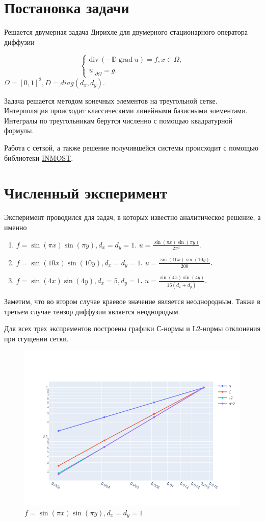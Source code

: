 \documentclass{article}
\DeclareMathOperator{\grad}{grad}
\newcommand{\divg}{\mathrm{div}\,}
\begin{document}
	
\section{Постановка задачи}
Решается двумерная задача Дирихле для двумерного стационарного оператора диффузии

$$
\begin{cases}
    \divg(-\mathbb{D} \grad u) = f, x \in \Omega, \\
    u|_{\partial \Omega} = g.
\end{cases}
$$
$
    \Omega = [0,1]^2, D = diag(d_x, d_y).
$

Задача решается методом конечных элементов на треугольной сетке. Интерполяция происходит классическими линейными базисными элементами. Интегралы по треугольникам берутся численно с помощью квадратурной формулы.

Работа с сеткой, а также решение получившейся системы происходит с помощью библиотеки \href{https://github.com/INMOST-DEV/INMOST}{INMOST}.


\section{Численный эксперимент}

Эксперимент проводился для задач, в которых известно аналитическое решение, а именно
\begin{enumerate}
	\item $f = \sin(\pi x) \sin(\pi y), d_x = d_y = 1$. $u = \frac{\sin(\pi x) \sin(\pi y)}{2 \pi^2}$.
	\item $f = \sin(10 x) \sin(10 y), d_x = d_y = 1$. $u = \frac{\sin(10 x) \sin(10 y)}{200}$.
	\item $f = \sin(4 x) \sin(4 y), d_x = 5, d_y = 1$. $u = \frac{\sin(4 x) \sin(4 y)}{16(d_x + d_y)}$.
\end{enumerate}

Заметим, что во втором случае краевое значение является неоднородным. Также в третьем случае тензор диффузии является неоднородым.

Для всех трех экспрементов построены графики С-нормы и L2-нормы отклонения при сгущении сетки.

\begin{figure}[h!]
	\centering
	\includegraphics[width=.9\textwidth]{img/res1.png}
	\caption{$f = \sin(\pi x) \sin(\pi y), d_x = d_y = 1$}
\end{figure}
\end{document}
